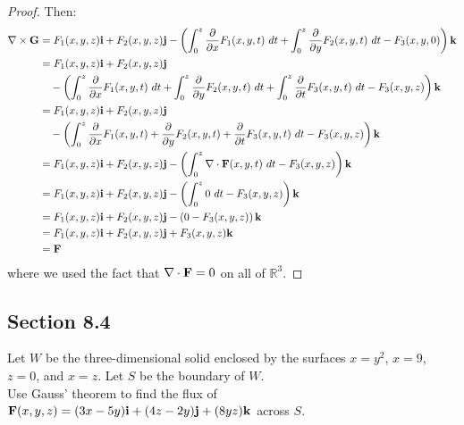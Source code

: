 \begin{proof}
    Then:
    \begin{align*}
        \nabla \times \vb{G} &= F_1(x, y, z) \vb{i} + F_2(x, y, z) \vb{j} - \left(\int_0^z \frac{\partial}{\partial x} F_1(x, y, t) \ dt + \int_0^z \frac{\partial}{\partial y} F_2(x, y, t) \ dt - F_3(x, y, 0)\right) \vb{k} \\
        &= F_1(x, y, z) \vb{i} + F_2(x, y, z) \vb{j} \\
        &\quad - \left(\int_0^z \frac{\partial}{\partial x} F_1(x, y, t) \ dt + \int_0^z \frac{\partial}{\partial y} F_2(x, y, t) \ dt + \int_0^z \frac{\partial }{\partial t} F_3(x, y, t) \ dt - F_3(x, y, z)\right) \vb{k} \\
        &= F_1(x, y, z) \vb{i} + F_2(x, y, z) \vb{j} \\
        &\quad - \left(\int_0^z \frac{\partial}{\partial x} F_1(x, y, t) + \frac{\partial}{\partial y} F_2(x, y, t) + \frac{\partial }{\partial t} F_3(x, y, t) \ dt - F_3(x, y, z)\right) \vb{k} \\
        &= F_1(x, y, z) \vb{i} + F_2(x, y, z) \vb{j} - \left(\int_0^z \nabla \cdot \vb{F}(x, y, t) \ dt - F_3(x, y, z)\right) \vb{k} \\
        &= F_1(x, y, z) \vb{i} + F_2(x, y, z) \vb{j} - \left(\int_0^z 0 \ dt - F_3(x, y, z)\right) \vb{k} \\
        &= F_1(x, y, z) \vb{i} + F_2(x, y, z) \vb{j} - \left(0 - F_3(x, y, z)\right) \vb{k} \\
        &= F_1(x, y, z) \vb{i} + F_2(x, y, z) \vb{j} + F_3(x, y, z) \vb{k} \\
        &= \vb{F}
    \end{align*}
    where we used the fact that \(\nabla \cdot \vb{F} = 0\) on all of \(\mathbb{R}^3\). 
\end{proof}

\subsection{Section 8.4}

\begin{tcolorbox}[
        title={Problem 14},
        valign=center,
        nobeforeafter,
        colframe=gray!95!black
    ]
    Let \(W\) be the three-dimensional solid enclosed by the surfaces \(x = y^2\), \(x = 9\), \(z = 0\), and \(x = z\). Let \(S\) be the boundary of \(W\). \\
    
    Use Gauss’ theorem to find the flux of \(\vb{F}(x, y, z) = (3x - 5y)\vb{i} + (4z - 2y)\vb{j} + (8yz)\vb{k}\) across \(S\).
\end{tcolorbox}

